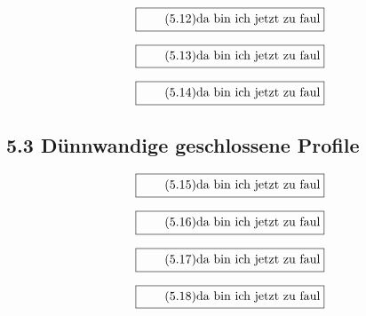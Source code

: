 \documentclass[11pt]{article}
\newcommand{\1}{ {\mathds{1}} }
\begin{document}
    \begin{equation}
      \boxed{
        \tag{5.12}
        \begin{split}
          \text{da bin ich jetzt zu faul}
        \end{split}
      }
    \end{equation}

    \begin{equation}
      \boxed{
        \tag{5.13}
        \begin{split}
          \text{da bin ich jetzt zu faul}
        \end{split}
      }
    \end{equation}

    \begin{equation}
      \boxed{
        \tag{5.14}
        \begin{split}
          \text{da bin ich jetzt zu faul}
        \end{split}
      }
    \end{equation}

    \subsection*{5.3 Dünnwandige geschlossene Profile}

    \begin{equation}
      \boxed{
        \tag{5.15}
        \begin{split}
          \text{da bin ich jetzt zu faul}
        \end{split}
      }
    \end{equation}

    \begin{equation}
      \boxed{
        \tag{5.16}
        \begin{split}
          \text{da bin ich jetzt zu faul}
        \end{split}
      }
    \end{equation}

    \begin{equation}
      \boxed{
        \tag{5.17}
        \begin{split}
          \text{da bin ich jetzt zu faul}
        \end{split}
      }
    \end{equation}

    \begin{equation}
      \boxed{
        \tag{5.18}
        \begin{split}
          \text{da bin ich jetzt zu faul}
        \end{split}
      }
    \end{equation}
\end{document}
